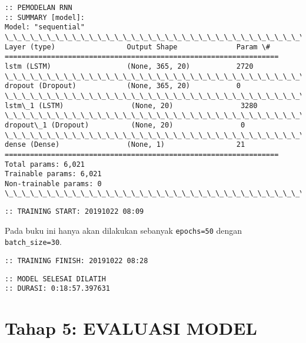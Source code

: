 \documentclass[11pt]{article}
\begin{document}
    \begin{Verbatim}[commandchars=\\\{\}]
:: PEMODELAN RNN
:: SUMMARY [model]:
Model: "sequential"
\_\_\_\_\_\_\_\_\_\_\_\_\_\_\_\_\_\_\_\_\_\_\_\_\_\_\_\_\_\_\_\_\_\_\_\_\_\_\_\_\_\_\_\_\_\_\_\_\_\_\_\_\_\_\_\_\_\_\_\_\_\_\_\_\_
Layer (type)                 Output Shape              Param \#
=================================================================
lstm (LSTM)                  (None, 365, 20)           2720
\_\_\_\_\_\_\_\_\_\_\_\_\_\_\_\_\_\_\_\_\_\_\_\_\_\_\_\_\_\_\_\_\_\_\_\_\_\_\_\_\_\_\_\_\_\_\_\_\_\_\_\_\_\_\_\_\_\_\_\_\_\_\_\_\_
dropout (Dropout)            (None, 365, 20)           0
\_\_\_\_\_\_\_\_\_\_\_\_\_\_\_\_\_\_\_\_\_\_\_\_\_\_\_\_\_\_\_\_\_\_\_\_\_\_\_\_\_\_\_\_\_\_\_\_\_\_\_\_\_\_\_\_\_\_\_\_\_\_\_\_\_
lstm\_1 (LSTM)                (None, 20)                3280
\_\_\_\_\_\_\_\_\_\_\_\_\_\_\_\_\_\_\_\_\_\_\_\_\_\_\_\_\_\_\_\_\_\_\_\_\_\_\_\_\_\_\_\_\_\_\_\_\_\_\_\_\_\_\_\_\_\_\_\_\_\_\_\_\_
dropout\_1 (Dropout)          (None, 20)                0
\_\_\_\_\_\_\_\_\_\_\_\_\_\_\_\_\_\_\_\_\_\_\_\_\_\_\_\_\_\_\_\_\_\_\_\_\_\_\_\_\_\_\_\_\_\_\_\_\_\_\_\_\_\_\_\_\_\_\_\_\_\_\_\_\_
dense (Dense)                (None, 1)                 21
=================================================================
Total params: 6,021
Trainable params: 6,021
Non-trainable params: 0
\_\_\_\_\_\_\_\_\_\_\_\_\_\_\_\_\_\_\_\_\_\_\_\_\_\_\_\_\_\_\_\_\_\_\_\_\_\_\_\_\_\_\_\_\_\_\_\_\_\_\_\_\_\_\_\_\_\_\_\_\_\_\_\_\_
    \end{Verbatim}

    \begin{Verbatim}[commandchars=\\\{\}]
:: TRAINING START: 20191022 08:09
    \end{Verbatim}

    Pada buku ini hanya akan dilakukan sebanyak \texttt{epochs=50} dengan
\texttt{batch\_size=30}.

    \begin{Verbatim}[commandchars=\\\{\}]
:: TRAINING FINISH: 20191022 08:28
    \end{Verbatim}

    \begin{Verbatim}[commandchars=\\\{\}]
:: MODEL SELESAI DILATIH
:: DURASI: 0:18:57.397631
    \end{Verbatim}

    \hypertarget{tahap-5-evaluasi-model}{%
\section{Tahap 5: EVALUASI MODEL}\label{tahap-5-evaluasi-model}}
\end{document}
